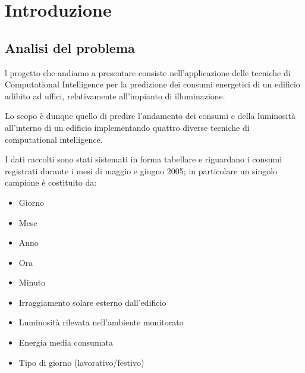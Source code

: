 
\maketitle
\thispagestyle{fancy}       %

\section{Introduzione}
\subsection{Analisi del problema}
l progetto che andiamo a presentare consiste nell’applicazione delle tecniche di Computational Intelligence per la predizione dei consumi energetici di un edificio adibito ad uffici, relativamente all’impianto di illuminazione.

Lo scopo è dunque quello di predire l'andamento dei consumi e della luminosità all'interno di un edificio implementando quattro diverse tecniche di computational intelligence.

I dati raccolti sono stati sistemati in forma tabellare e riguardano i consumi registrati durante i mesi di maggio e giugno 2005; in particolare un singolo campione è costituito da:

\begin{itemize}
  \item Giorno
  \item Mese
  \item Anno
  \item Ora
  \item Minuto
  \item Irraggiamento solare esterno dall'edificio
  \item Luminosità rilevata nell'ambiente monitorato
  \item Energia media consumata
  \item Tipo di giorno (lavorativo/festivo)
\end{itemize}
